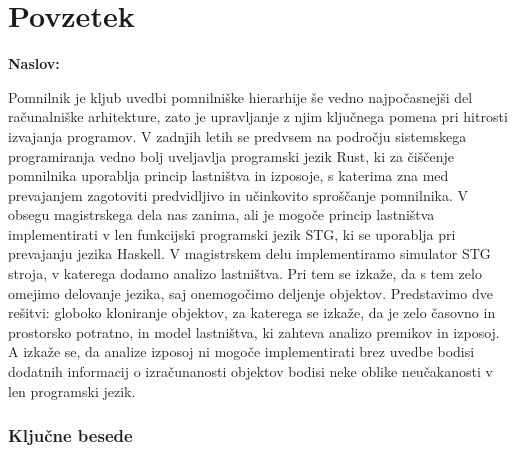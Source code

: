 \chapter*{Povzetek}

\noindent\textbf{Naslov:} \ttitle
\bigskip

Pomnilnik je kljub uvedbi pomnilniške hierarhije še vedno najpočasnejši del računalniške arhitekture, zato je upravljanje z njim ključnega pomena pri hitrosti izvajanja programov. V zadnjih letih se predvsem na področju sistemskega programiranja vedno bolj uveljavlja programski jezik Rust, ki za čiščenje pomnilnika uporablja princip lastništva in izposoje, s katerima zna med prevajanjem zagotoviti predvidljivo in učinkovito sproščanje pomnilnika. V obsegu magistrskega dela nas zanima, ali je mogoče princip lastništva implementirati v len funkcijski programski jezik STG, ki se uporablja pri prevajanju jezika Haskell. V magistrskem delu implementiramo simulator STG stroja, v katerega dodamo analizo lastništva. Pri tem se izkaže, da s tem zelo omejimo delovanje jezika, saj onemogočimo deljenje objektov. Predstavimo dve rešitvi: globoko kloniranje objektov, za katerega se izkaže, da je zelo časovno in prostorsko potratno, in model lastništva, ki zahteva analizo premikov in izposoj. A izkaže se, da analize izposoj ni mogoče implementirati brez uvedbe bodisi dodatnih informacij o izračunanosti objektov bodisi neke oblike neučakanosti v len programski jezik.




\subsection*{Ključne besede}
\textit{\tkeywords}
\clearemptydoublepage